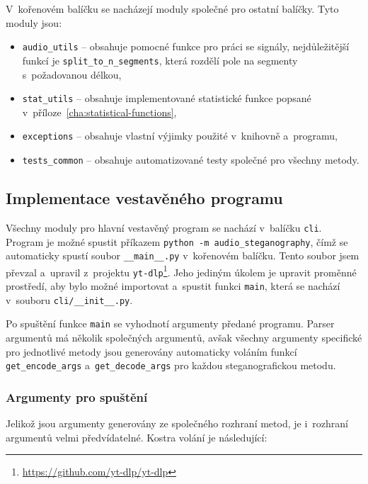 \noindent V~kořenovém balíčku se nacházejí moduly společné pro ostatní balíčky.
Tyto moduly jsou:

\begin{itemize}
    \item \texttt{audio\_utils} -- obsahuje pomocné funkce pro práci se
        signály, nejdůležitější funkcí je \texttt{split\_to\_n\_segments},
        která rozdělí pole na segmenty s~požadovanou délkou,
    \item \texttt{stat\_utils} -- obsahuje implementované statistické funkce
        popsané v~příloze~\ref{cha:statistical-functions},
    \item \texttt{exceptions} -- obsahuje vlastní výjimky použité v~knihovně
        a~programu,
    \item \texttt{tests\_common} -- obsahuje automatizované testy společné pro
        všechny metody.
\end{itemize}

\subsection*{Implementace vestavěného programu}
\label{sub:tui-implementation}

Všechny moduly pro hlavní vestavěný program se nachází v~balíčku \texttt{cli}.
Program je možné spustit příkazem \texttt{python -m audio\_steganography}, čímž
se automaticky spustí soubor \texttt{\_\_main\_\_.py} v~kořenovém balíčku.
Tento soubor jsem převzal a~upravil z~projektu
\texttt{yt-dlp}\footnote{\url{https://github.com/yt-dlp/yt-dlp}}. Jeho jediným
úkolem je upravit proměnné prostředí, aby bylo možné importovat a~spustit
funkci \texttt{main}, která se nachází v~souboru \texttt{cli/\_\_init\_\_.py}.

Po spuštění funkce \texttt{main} se vyhodnotí argumenty předané programu.
Parser argumentů má několik společných argumentů, avšak všechny argumenty
specifické pro jednotlivé metody jsou generovány automaticky voláním funkcí
\texttt{get\_encode\_args} a~\texttt{get\_decode\_args} pro každou
steganografickou metodu.

\subsubsection*{Argumenty pro spuštění}
\label{ssub:tui-arguments}

Jelikož jsou argumenty generovány ze společného rozhraní metod, je i~rozhraní
argumentů velmi předvídatelné. Kostra volání je následující:

